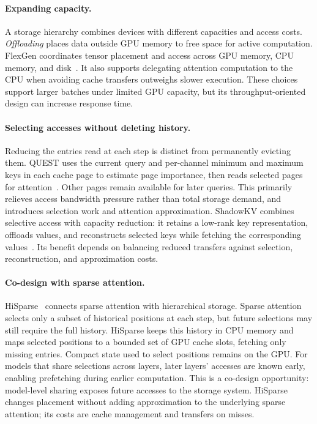 \paragraph{Expanding capacity.}
A storage hierarchy combines devices with different capacities and access costs. \emph{Offloading} places data outside GPU memory to free space for active computation. FlexGen coordinates tensor placement and access across GPU memory, CPU memory, and disk~\cite{kv_sheng2023flexgen}. It also supports delegating attention computation to the CPU when avoiding cache transfers outweighs slower execution. These choices support larger batches under limited GPU capacity, but its throughput-oriented design can increase response time.

\paragraph{Selecting accesses without deleting history.}
Reducing the entries read at each step is distinct from permanently evicting them. QUEST uses the current query and per-channel minimum and maximum keys in each cache page to estimate page importance, then reads selected pages for attention~\cite{kv_tang2024quest}. Other pages remain available for later queries. This primarily relieves access bandwidth pressure rather than total storage demand, and introduces selection work and attention approximation. ShadowKV combines selective access with capacity reduction: it retains a low-rank key representation, offloads values, and reconstructs selected keys while fetching the corresponding values~\cite{kv_sun2025shadowkv}. Its benefit depends on balancing reduced transfers against selection, reconstruction, and approximation costs.

\paragraph{Co-design with sparse attention.}
HiSparse~\cite{kv_xie2026hisparse} connects sparse attention with hierarchical storage. Sparse attention selects only a subset of historical positions at each step, but future selections may still require the full history. HiSparse keeps this history in CPU memory and maps selected positions to a bounded set of GPU cache slots, fetching only missing entries. Compact state used to select positions remains on the GPU. For models that share selections across layers, later layers' accesses are known early, enabling prefetching during earlier computation. This is a co-design opportunity: model-level sharing exposes future accesses to the storage system. HiSparse changes placement without adding approximation to the underlying sparse attention; its costs are cache management and transfers on misses.

